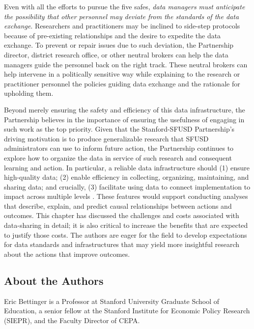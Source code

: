 \documentclass[
]{WileySix}
\begin{document}
Even with all the efforts to pursue the five safes, \emph{data managers must anticipate the possibility that other personnel may deviate from the standards of the data exchange}. Researchers and practitioners may be inclined to side-step protocols because of pre-existing relationships and the desire to expedite the data exchange. To prevent or repair issues due to such deviation, the Partnership director, district research office, or other neutral brokers can help the data managers guide the personnel back on the right track. These neutral brokers can help intervene in a politically sensitive way while explaining to the research or practitioner personnel the policies guiding data exchange and the rationale for upholding them.

Beyond merely ensuring the safety and efficiency of this data infrastructure, the Partnership believes in the importance of ensuring the usefulness of engaging in such work as the top priority. Given that the Stanford-SFUSD Partnership's driving motivation is to produce generalizable research that SFUSD administrators can use to inform future action, the Partnership continues to explore how to organize the data in service of such research and consequent learning and action. In particular, a reliable data infrastructure should (1) ensure high-quality data; (2) enable efficiency in collecting, organizing, maintaining, and sharing data; and crucially, (3) facilitate using data to connect implementation to impact across multiple levels \citep{ming2019}. These features would support conducting analyses that describe, explain, and predict causal relationships between actions and outcomes. This chapter has discussed the challenges and costs associated with data-sharing in detail; it is also critical to increase the benefits that are expected to justify those costs. The authors are eager for the field to develop expectations for data standards and infrastructures that may yield more insightful research about the actions that improve outcomes.

\hypertarget{about-the-authors-5}{%
\subsection*{About the Authors}\label{about-the-authors-5}}

Eric Bettinger is a Professor at Stanford University Graduate School of Education, a senior fellow at the Stanford Institute for Economic Policy Research (SIEPR), and the Faculty Director of CEPA.
\end{document}
